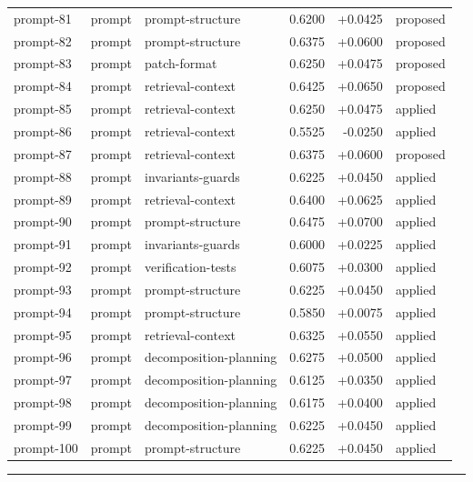 \begin{center}
\begin{longtable}{llp{5.2cm}rrl}
prompt-81 & prompt & prompt-structure & 0.6200 & +0.0425 & proposed \\
prompt-82 & prompt & prompt-structure & 0.6375 & +0.0600 & proposed \\
prompt-83 & prompt & patch-format & 0.6250 & +0.0475 & proposed \\
prompt-84 & prompt & retrieval-context & 0.6425 & +0.0650 & proposed \\
prompt-85 & prompt & retrieval-context & 0.6250 & +0.0475 & applied \\
prompt-86 & prompt & retrieval-context & 0.5525 & -0.0250 & applied \\
prompt-87 & prompt & retrieval-context & 0.6375 & +0.0600 & proposed \\
prompt-88 & prompt & invariants-guards & 0.6225 & +0.0450 & applied \\
prompt-89 & prompt & retrieval-context & 0.6400 & +0.0625 & applied \\
prompt-90 & prompt & prompt-structure & 0.6475 & +0.0700 & applied \\
prompt-91 & prompt & invariants-guards & 0.6000 & +0.0225 & applied \\
prompt-92 & prompt & verification-tests & 0.6075 & +0.0300 & applied \\
prompt-93 & prompt & prompt-structure & 0.6225 & +0.0450 & applied \\
prompt-94 & prompt & prompt-structure & 0.5850 & +0.0075 & applied \\
prompt-95 & prompt & retrieval-context & 0.6325 & +0.0550 & applied \\
prompt-96 & prompt & decomposition-planning & 0.6275 & +0.0500 & applied \\
prompt-97 & prompt & decomposition-planning & 0.6125 & +0.0350 & applied \\
prompt-98 & prompt & decomposition-planning & 0.6175 & +0.0400 & applied \\
prompt-99 & prompt & decomposition-planning & 0.6225 & +0.0450 & applied \\
prompt-100 & prompt & prompt-structure & 0.6225 & +0.0450 & applied \\
\bottomrule\end{longtable}\end{center}
\par\bigskip\hrule\bigskip
